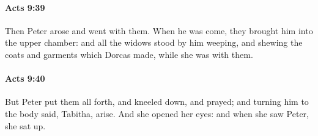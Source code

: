 		\paragraph{Acts 9:39} %
			\label{ACTS-9-39}

			Then Peter arose and went with them.  When he was come, they brought him into the upper chamber: and all the widows stood by him weeping, and shewing the coats and garments which Dorcas made, while she was with them.

			\begin{framed}
			\scriptsize
				\begin{compactdesc}
					\item[SBLG] 
				\end{compactdesc}
			\end{framed}

		\paragraph{Acts 9:40} %
			\label{ACTS-9-40}

			But Peter put them all forth, and kneeled down, and prayed; and turning him to the body said, Tabitha, arise.  And she opened her eyes: and when she saw Peter, she sat up.

